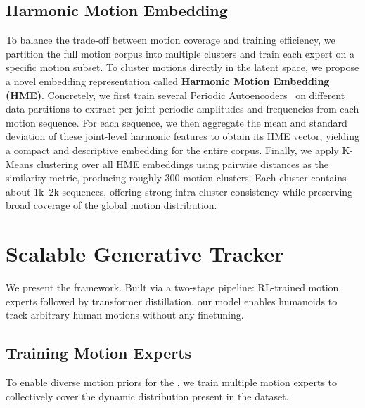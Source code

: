 \subsection{Harmonic Motion Embedding}

To balance the trade-off between motion coverage and training efficiency, we partition the full motion corpus into multiple clusters and train each expert on a specific motion subset. To cluster motions directly in the latent space, we propose a novel embedding representation called \textbf{Harmonic Motion Embedding (HME)}. Concretely, we first train several Periodic Autoencoders~\cite{pae22} on different data partitions to extract per-joint periodic amplitudes and frequencies from each motion sequence. For each sequence, we then aggregate the mean and standard deviation of these joint-level harmonic features to obtain its HME vector, yielding a compact and descriptive embedding for the entire corpus. Finally, we apply K-Means clustering over all HME embeddings using pairwise distances as the similarity metric, producing roughly 300 motion clusters. Each cluster contains about 1k–2k sequences, offering strong intra-cluster consistency while preserving broad coverage of the global motion distribution.


\section{Scalable Generative Tracker}

We present the \textbf{\methodname} framework. Built via a two-stage pipeline: RL-trained motion experts followed by transformer distillation, our model enables humanoids to track arbitrary human motions without any finetuning.

\subsection{Training Motion Experts}
To enable diverse motion priors for the \methodname, we train multiple motion experts to collectively cover the dynamic distribution present in the dataset. 


